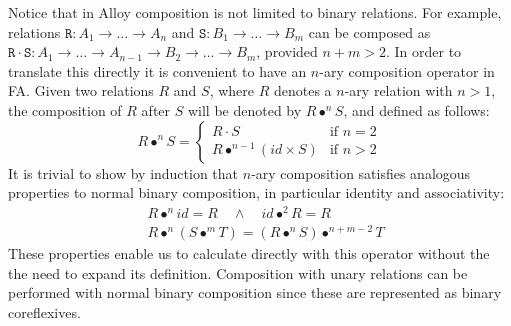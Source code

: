 \documentclass{llncs}
\begin{document}
Notice that in Alloy composition is not limited to binary relations. For example, relations $\mathtt{R}: A_1 \rightarrow \dots \rightarrow A_n$ and $\mathtt{S}: B_1 \rightarrow \dots \rightarrow B_m$ can be composed as $\mathtt{R \cdot S} : A_1 \rightarrow \dots \rightarrow A_{n-1} \rightarrow B_2 \rightarrow \dots \rightarrow B_m$, provided $n+m > 2$. In order to translate this directly it is convenient to have an $n$-ary composition operator in FA. Given two relations $R$ and $S$, where $R$ denotes a $n$-ary relation with $n>1$, the composition of $R$ after $S$ will be denoted by $R \bullet^n S$, and defined as follows:
\begin{equation*}
R \bullet^n S = \left\{ \begin {array}{cl}
R \cdot S & \textrm{if $n = 2$}\\
R \bullet^{n-1} (id \times S) & \textrm{if $n > 2$}
\end {array} \right.
\label{eq:uncomp}
\end{equation*}
It is trivial to show by induction that $n$-ary composition satisfies analogous properties to normal binary composition, in particular identity and associativity: 
\begin{align*}
 & R \bullet^n id = R \quad \wedge \quad id \bullet^2 R = R\\
 & R \bullet^n (S \bullet^m T) = (R \bullet^n S) \bullet^{n+m-2} T
\end{align*}
These properties enable us to calculate directly with this operator without the the need to expand its definition. Composition with unary relations can be performed with normal binary composition since these are represented as binary coreflexives.
\end{document}
